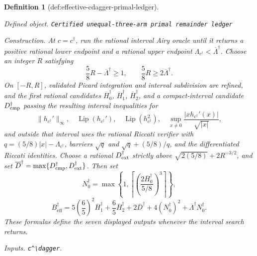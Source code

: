 \documentclass{article}
\newtheorem{definition}{Definition}
\begin{document}
\begin{definition}[def:effective-cdagger-primal-ledger]\label{def:effective-cdagger-primal-ledger}
\par\smallskip\noindent\emph{Defined object.} \texttt{Certified unequal-\allowbreak{}three-\allowbreak{}arm primal remainder ledger}
\par\smallskip\noindent\emph{Construction.} At \(c=c^\dagger\), run the rational interval Airy oracle until it returns a positive rational lower endpoint and a rational upper endpoint
\(\Lambda_{c^\dagger}<\overline\Lambda^\dagger\).  Choose an integer
\(R\) satisfying
\[
\frac58R-\overline\Lambda^\dagger\ge1,
\qquad
\frac58R\ge2\overline\Lambda^\dagger.
\]
On \([-R,R]\), validated Picard integration and interval subdivision are refined, and the first rational candidates
\(\overline H_0^\dagger\), \(\overline H_1^\dagger\),
\(\overline H_2^\dagger\), and a compact-interval candidate \(D_{\rm cmp}^\dagger\) passing the resulting interval inequalities for
\[
\|h_{c^\dagger}'\|_\infty,
\quad \operatorname{Lip}(h_{c^\dagger}'),
\quad \operatorname{Lip}(h_{c^\dagger}^2),
\quad \sup_{x\ne0}\frac{|xh_{c^\dagger}'(x)|}{\sqrt{|x|}},
\]
and outside that interval uses the rational Riccati verifier with
\(q=(5/8)|x|-\Lambda_{c^\dagger}\), barriers
\(\sqrt q\) and \(\sqrt q+(5/8)/q\), and the differentiated Riccati identities.
Choose a rational \(D_{\rm ext}^\dagger\) strictly above
\(\sqrt{2(5/8)}+2R^{-3/2}\), and set
\(\overline D^\dagger=\max\{D_{\rm cmp}^\dagger,D_{\rm ext}^\dagger\}\).
Then set
\[
N_0^\dagger=
\max\left\{1,
\left\lceil
\left(\frac{2\overline H_0^\dagger}{5/8}\right)^3
\right\rceil\right\},
\]
\[
B_{\mathrm{eff}}^\dagger=
5\left(\frac65\right)^2\overline H_1^\dagger
+\frac65\overline H_2^\dagger+2\overline D^\dagger
+4(N_0^\dagger)^2+\overline\Lambda^\dagger N_0^\dagger.
\]
These formulas define the seven displayed outputs whenever the interval search returns.
\par\smallskip\noindent\emph{Inputs.} \texttt{c\textasciicircum{}\textbackslash{}\allowbreak{}dagger}.
\end{definition}
\end{document}
